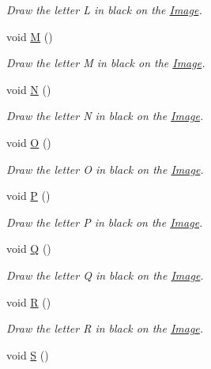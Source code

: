 \begin{DoxyCompactItemize}
\begin{DoxyCompactList}\small\item\em Draw the letter L in black on the \mbox{\hyperlink{class_image}{Image}}. \end{DoxyCompactList}\item 
void \mbox{\hyperlink{class_font_v2_a65ab055c8555447a542ed5c26ef925ee}{M}} ()
\begin{DoxyCompactList}\small\item\em Draw the letter M in black on the \mbox{\hyperlink{class_image}{Image}}. \end{DoxyCompactList}\item 
void \mbox{\hyperlink{class_font_v2_ab0f1cbe6375f24c45f6d9bd518165353}{N}} ()
\begin{DoxyCompactList}\small\item\em Draw the letter N in black on the \mbox{\hyperlink{class_image}{Image}}. \end{DoxyCompactList}\item 
void \mbox{\hyperlink{class_font_v2_afb1d85a50e3982f0f1e77d5e1ca7f53c}{O}} ()
\begin{DoxyCompactList}\small\item\em Draw the letter O in black on the \mbox{\hyperlink{class_image}{Image}}. \end{DoxyCompactList}\item 
void \mbox{\hyperlink{class_font_v2_ab47b245b84ea5c1dd89055c83b6ea052}{P}} ()
\begin{DoxyCompactList}\small\item\em Draw the letter P in black on the \mbox{\hyperlink{class_image}{Image}}. \end{DoxyCompactList}\item 
void \mbox{\hyperlink{class_font_v2_af8e979a962becf153ecc82051ad2c8fc}{Q}} ()
\begin{DoxyCompactList}\small\item\em Draw the letter Q in black on the \mbox{\hyperlink{class_image}{Image}}. \end{DoxyCompactList}\item 
void \mbox{\hyperlink{class_font_v2_a852e482795dc7557137419b713711774}{R}} ()
\begin{DoxyCompactList}\small\item\em Draw the letter R in black on the \mbox{\hyperlink{class_image}{Image}}. \end{DoxyCompactList}\item 
void \mbox{\hyperlink{class_font_v2_adcccd6f866d51bb27568d8c4c465551f}{S}} ()

\end{DoxyCompactItemize}
